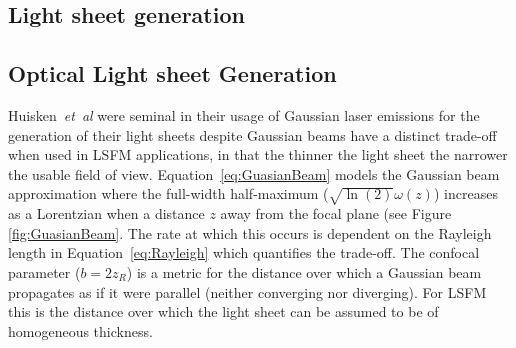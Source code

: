 


%

\subsection{Light sheet generation}
\subsection{Optical Light sheet Generation}


Huisken~\emph{et~al} were seminal in their usage of Gaussian laser emissions for the generation of their light sheets despite Gaussian beams have a distinct trade-off when used in LSFM applications, in that the thinner the light sheet the narrower the usable field of view.
Equation~\eqref{eq:GuasianBeam} models the Gaussian beam approximation where the full-width half-maximum ($\sqrt{\ln(2)}\omega(z)$) %
increases as a Lorentzian when a distance $z$ away from the focal plane (see Figure \ref{fig:GuasianBeam}.
The rate at which this occurs is dependent on the Rayleigh length in Equation~\eqref{eq:Rayleigh} which quantifies the trade-off.
The confocal parameter ($b=2z_R$) is a metric for the distance over which a Gaussian beam propagates as if it were parallel (neither converging nor diverging).
For LSFM this is the distance over which the light sheet can be assumed to be of homogeneous thickness.

